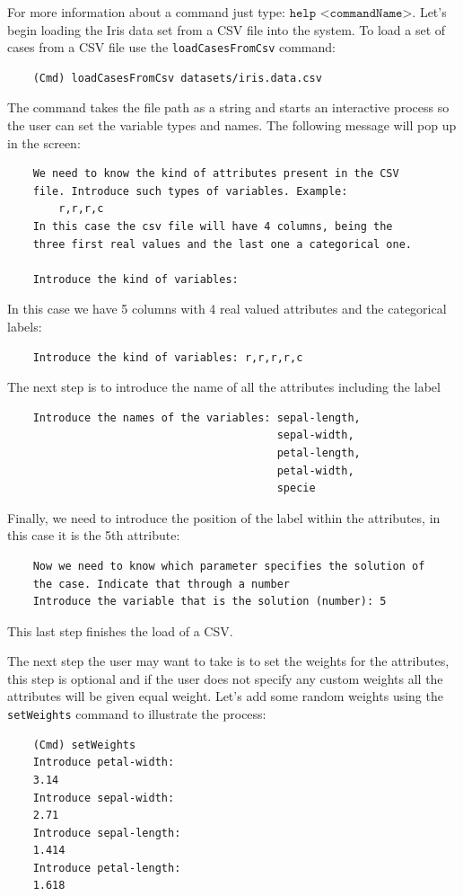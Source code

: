\documentclass[11pt]{article}
\begin{document}
For more information about a command just type: $\texttt{help <commandName>}$. Let's begin loading the Iris data set from a CSV file into the system. To load a set of cases from a CSV file use the \texttt{loadCasesFromCsv} command:
\begin{verbatim}
    (Cmd) loadCasesFromCsv datasets/iris.data.csv
\end{verbatim}

The command takes the file path as a string and starts an interactive process so the user can set the variable types and names. The following message will pop up in the screen:
\begin{verbatim}
    We need to know the kind of attributes present in the CSV 
    file. Introduce such types of variables. Example:
        r,r,r,c
    In this case the csv file will have 4 columns, being the 
    three first real values and the last one a categorical one.

    Introduce the kind of variables:
\end{verbatim}

In this case we have 5 columns with 4 real valued attributes and the categorical labels:
\begin{verbatim}
    Introduce the kind of variables: r,r,r,r,c
\end{verbatim}

The next step is to introduce the name of all the attributes including the label
\begin{verbatim}
    Introduce the names of the variables: sepal-length, 
                                          sepal-width, 
                                          petal-length, 
                                          petal-width, 
                                          specie
\end{verbatim}

Finally, we need to introduce the position of the label within the attributes, in this case it is the 5th attribute:
\begin{verbatim}
    Now we need to know which parameter specifies the solution of 
    the case. Indicate that through a number
    Introduce the variable that is the solution (number): 5
\end{verbatim}

This last step finishes the load of a CSV. 

The next step the user may want to take is to set the weights for the attributes, this step is optional and if the user does not specify any custom weights all the attributes will be given equal weight. Let's add some random weights using the \texttt{setWeights} command to illustrate the process:
\begin{verbatim}
    (Cmd) setWeights
    Introduce petal-width:
    3.14
    Introduce sepal-width:
    2.71
    Introduce sepal-length:
    1.414
    Introduce petal-length:
    1.618
\end{verbatim}
\end{document}

